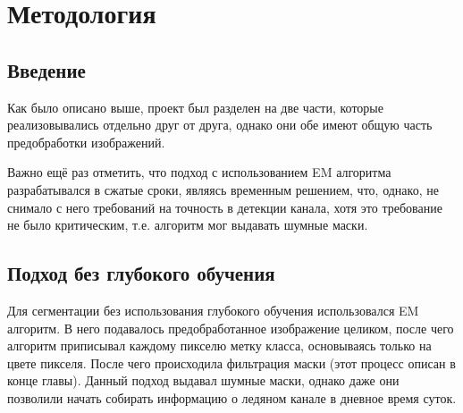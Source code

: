 \section{Методология}
\subsection{Введение}
Как было описано выше, проект был разделен на две части, которые реализовывались отдельно друг от друга, однако они обе имеют общую часть предобработки изображений.

Важно ещё раз отметить, что подход с использованием EM алгоритма разрабатывался в сжатые сроки, являясь временным решением, что, однако, не снимало с него требований 
на точность в детекции канала, хотя это требование не было критическим, т.е. алгоритм мог выдавать шумные маски. 
\subsection{Подход без глубокого обучения}
Для сегментации без использования глубокого обучения использовался EM алгоритм. В него подавалось предобработанное изображение целиком, после чего алгоритм приписывал
каждому пикселю метку класса, основываясь только на цвете пикселя. После чего происходила фильтрация маски (этот процесс описан в конце главы). Данный подход выдавал 
шумные маски, однако даже они позволили начать собирать информацию о ледяном канале в дневное время суток.

